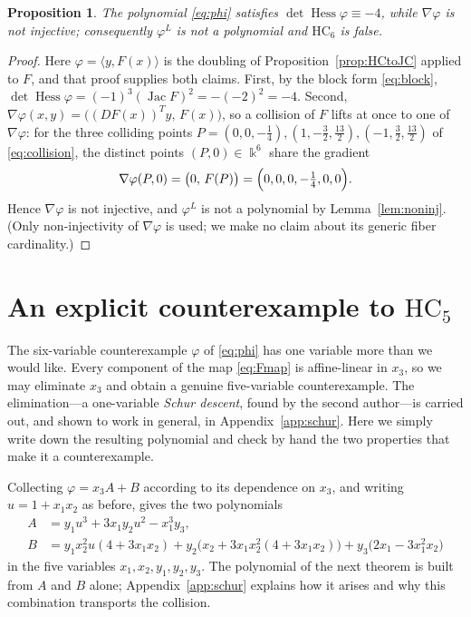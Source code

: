 \documentclass[11pt]{article}
\theoremstyle{plain}
\newtheorem{proposition}[theorem]{Proposition}
\theoremstyle{definition}
\newcommand{\kk}{\Bbbk}
\newcommand{\HC}{\mathrm{HC}}
\newcommand{\Hess}{\operatorname{Hess}}
\newcommand{\Jac}{\operatorname{Jac}}
\begin{document}
\begin{proposition}\label{prop:HC6}
The polynomial \eqref{eq:phi} satisfies
$\det\Hess\varphi\equiv-4$, while $\nabla\varphi$ is not injective;
consequently $\varphi^{L}$ is not a polynomial and $\HC_6$ is false.
\end{proposition}

\begin{proof}
Here $\varphi=\langle y,F(x)\rangle$ is the doubling of
Proposition~\ref{prop:HCtoJC} applied to $F$, and that proof supplies
both claims. First, by the block form \eqref{eq:block},
$\det\Hess\varphi=(-1)^3(\Jac F)^2=-(-2)^2=-4$. Second,
$\nabla\varphi(x,y)=\bigl((DF(x))^{T}y,\,F(x)\bigr)$, so a collision of
$F$ lifts at once to one of $\nabla\varphi$: for the three colliding
points $P=(0,0,-\tfrac14),(1,-\tfrac32,\tfrac{13}2),
(-1,\tfrac32,\tfrac{13}2)$ of \eqref{eq:collision}, the distinct points
$(P,0)\in\kk^{6}$ share the gradient
\[
\nabla\varphi(P,0)=\bigl(0,\,F(P)\bigr)=\Bigl(0,0,0,-\tfrac14,0,0\Bigr).
\]
Hence $\nabla\varphi$ is not injective, and $\varphi^{L}$ is not a
polynomial by Lemma~\ref{lem:noninj}. (Only non-injectivity of
$\nabla\varphi$ is used; we make no claim about its generic fiber
cardinality.)
\end{proof}

\section{An explicit counterexample to \texorpdfstring{$\HC_5$}{HC5}}\label{sec:psi5}

The six-variable counterexample $\varphi$ of \eqref{eq:phi} has one variable
more than we would like. Every component of the map \eqref{eq:Fmap} is
affine-linear in $x_3$, so we may eliminate $x_3$ and obtain a
genuine five-variable counterexample. The elimination---a one-variable
\emph{Schur descent}, found by the second author---is
carried out, and shown to work in general, in Appendix~\ref{app:schur}. Here we simply write down the resulting
polynomial and check by hand the two properties that make it a
counterexample.

Collecting $\varphi=x_3A+B$ according to its dependence on $x_3$, and
writing $u=1+x_1x_2$ as before, gives the two polynomials
\begin{align*}
A&=y_1u^3+3x_1y_2u^2-x_1^3y_3,\\
B&=y_1x_2^2u(4+3x_1x_2)
+y_2\bigl(x_2+3x_1x_2^2(4+3x_1x_2)\bigr)
+y_3\bigl(2x_1-3x_1^2x_2\bigr)
\end{align*}
in the five variables $x_1,x_2,y_1,y_2,y_3$. The polynomial of the next
theorem is built from $A$ and $B$ alone; Appendix~\ref{app:schur}
explains how it arises and why this combination transports the collision.
\end{document}
